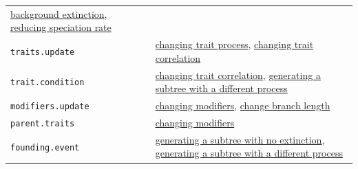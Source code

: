 \documentclass[
]{book}
\begin{document}
\begin{longtable}[]{@{}ll@{}}
\begin{minipage}[t]{0.39\columnwidth}
\protect\hyperlink{EGbg_ext}{background extinction}, \protect\hyperlink{EGred_spec}{reducing speciation rate}\strut
\end{minipage}\tabularnewline
\begin{minipage}[t]{0.55\columnwidth}\raggedright
\texttt{traits.update}\strut
\end{minipage} & \begin{minipage}[t]{0.39\columnwidth}\raggedright
\protect\hyperlink{EG_change_trait}{changing trait process}, \protect\hyperlink{EG_change_correlation}{changing trait correlation}\strut
\end{minipage}\tabularnewline
\begin{minipage}[t]{0.55\columnwidth}\raggedright
\texttt{trait.condition}\strut
\end{minipage} & \begin{minipage}[t]{0.39\columnwidth}\raggedright
\protect\hyperlink{EG_change_correlation}{changing trait correlation}, \href{EG_founding_traits}{generating a subtree with a different process}\strut
\end{minipage}\tabularnewline
\begin{minipage}[t]{0.55\columnwidth}\raggedright
\texttt{modifiers.update}\strut
\end{minipage} & \begin{minipage}[t]{0.39\columnwidth}\raggedright
\protect\hyperlink{EG_change_modif}{changing modifiers}, \protect\hyperlink{EG_modify_brlen}{change branch length}\strut
\end{minipage}\tabularnewline
\begin{minipage}[t]{0.55\columnwidth}\raggedright
\texttt{parent.traits}\strut
\end{minipage} & \begin{minipage}[t]{0.39\columnwidth}\raggedright
\protect\hyperlink{EG_change_modif}{changing modifiers}\strut
\end{minipage}\tabularnewline
\begin{minipage}[t]{0.55\columnwidth}\raggedright
\texttt{founding.event}\strut
\end{minipage} & \begin{minipage}[t]{0.39\columnwidth}\raggedright
\protect\hyperlink{EG_founding_purebirth}{generating a subtree with no extinction}, \href{EG_founding_traits}{generating a subtree with a different process}\strut
\end{minipage}\tabularnewline
\bottomrule
\end{longtable}
\end{document}
